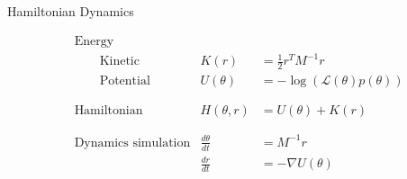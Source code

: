 \documentclass[12pt]{beamer}
\begin{document}
\begin{frame}
\begin{columns}
\begin{column}{0.5\textwidth}
\begin{algorithm}[H]
{		            \BlankLine

		        }

		        \BlankLine


		        \BlankLine


		    \end{algorithm}

		\end{column}
	\end{columns}

\end{frame}


\begin{frame}
	
	\null
	{\large Hamiltonian Dynamics}
	\vspace{\baselineskip}
	\vfill

	\footnotesize

	\begin{align*}
		& \text{Energy} & & \\
		& \quad\quad \text{Kinetic} 	& K(r) 					& = \frac{1}{2} r^T M^{-1} r \\
		& \quad\quad \text{Potential} 	& U(\theta) 			& = - \log(\mathcal{L}(\theta)p(\theta)) \\
		& & & \\
		& & & \\
		& \text{Hamiltonian} 			& H(\theta,r)  			& = U(\theta) + K(r) \\
		& & & \\
		& & & \\
		& \text{Dynamics simulation}	& \frac{d\theta}{dt} 	& = M^{-1} r \\
		& 								& \frac{dr}{dt}			& = - \nabla U (\theta) \\
	\end{align*}

	\vfill

\end{frame}
\end{document}
